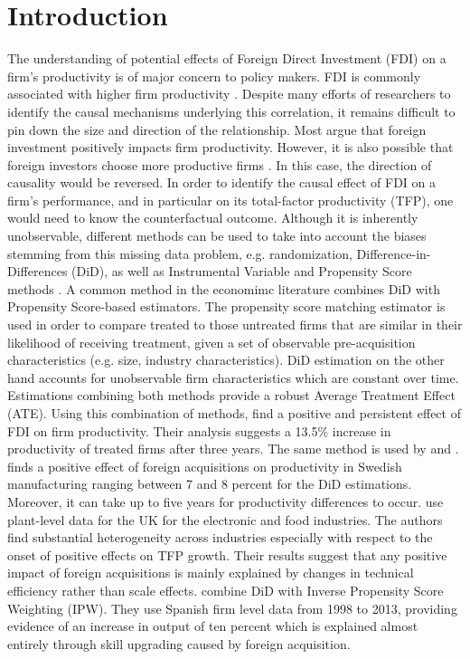 \documentclass[a4paper,11pt]{scrartcl}
\begin{document}
\section{Introduction}

The understanding of potential effects of Foreign Direct Investment (FDI) on a firm's productivity is of major concern to policy makers. FDI is commonly associated with higher firm productivity \citep{girma2007}. Despite many efforts of researchers to identify the causal mechanisms underlying this correlation, it remains difficult to pin down the size and direction of the relationship. Most argue that foreign investment positively impacts firm productivity. However, it is also possible that foreign investors choose more productive firms \citep{arnold2009}. In this case, the direction of causality would be reversed. 
In order to identify the causal effect of FDI on a firm’s performance, and in particular on its total-factor productivity (TFP), one would need to know the counterfactual outcome. Although it is inherently unobservable, different methods can be used to take into account the biases stemming from this missing data problem, e.g. randomization,  Difference-in-Differences (DiD), as well as Instrumental Variable and Propensity Score methods \citep{karpaty2007}. A common method in the economimc literature combines DiD with Propensity Score-based estimators. The propensity score matching estimator is used in order to compare treated to those untreated firms that are similar in their likelihood of receiving treatment, given a set of observable pre-acquisition characteristics (e.g. size, industry characteristics). DiD estimation on the other hand accounts for unobservable firm characteristics which are constant over time. Estimations combining both methods provide a robust Average Treatment Effect (ATE). 
Using this combination of methods, \citet{arnold2009}  find a positive and persistent effect of FDI on firm productivity. Their analysis suggests a 13.5\% increase in productivity of treated firms after three years. The same method is used by \citet{karpaty2007, girma2007} and \citet{schiffbauer2017}. \citet{karpaty2007} finds a positive effect of foreign acquisitions on productivity in Swedish manufacturing ranging between 7 and 8 percent for the DiD estimations. Moreover, it can take up to five years for productivity differences to occur. \citet{girma2007} use plant-level data for the UK for the electronic and food industries. The authors find substantial heterogeneity across industries especially with respect to the onset of positive effects on TFP growth. Their results suggest that any positive impact of foreign acquisitions is mainly explained by changes in technical efficiency rather than scale effects. \citet{koch2019} combine DiD with Inverse Propensity Score Weighting (IPW). They use Spanish firm level data from 1998 to 2013, providing evidence of an increase in output of ten percent which is explained almost entirely through skill upgrading caused by foreign acquisition.
\end{document}
